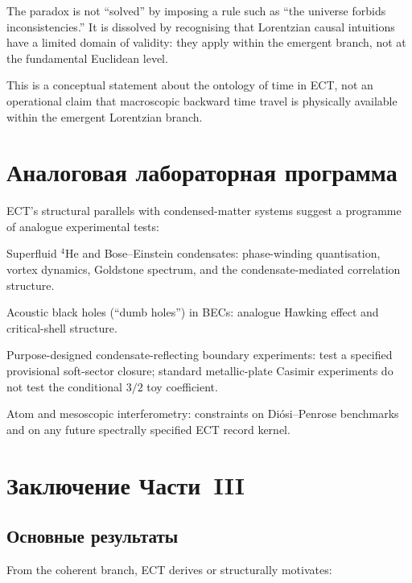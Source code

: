 \documentclass[11pt,a4paper]{article}
\begin{document}
The paradox is not ``solved'' by imposing a rule such as ``the universe forbids inconsistencies.'' It is dissolved by recognising that Lorentzian causal intuitions have a limited domain of validity: they apply within the emergent branch, not at the fundamental Euclidean level.

This is a conceptual statement about the ontology of time in ECT, not an operational claim that macroscopic backward time travel is physically available within the emergent Lorentzian branch.


\section{Аналоговая лабораторная программа}

ECT's structural parallels with condensed-matter systems suggest a programme of analogue experimental tests:

Superfluid $^4$He and Bose--Einstein condensates: phase-winding quantisation, vortex dynamics, Goldstone spectrum, and the condensate-mediated correlation structure.

Acoustic black holes (``dumb holes'') in BECs: analogue Hawking effect and critical-shell structure.

Purpose-designed condensate-reflecting boundary experiments: test a specified provisional soft-sector closure; standard metallic-plate Casimir experiments do not test the conditional $3/2$ toy coefficient.

Atom and mesoscopic interferometry: constraints on Di\'osi--Penrose benchmarks and on any future spectrally specified ECT record kernel.


\section{Заключение Части~III}

\subsection{Основные результаты}

From the coherent branch, ECT derives or structurally motivates:
\end{document}
